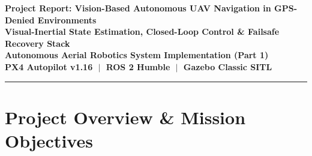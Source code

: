 \documentclass[11pt,a4paper]{article}
\begin{document}
\begin{center}
  {\huge\bfseries\color{primary} Project Report: Vision-Based Autonomous UAV Navigation in GPS-Denied Environments}\\[0.35cm]
  {\Large\bfseries\color{secondary} Visual-Inertial State Estimation, Closed-Loop Control \& Failsafe Recovery Stack}\\[0.4cm]
  {\normalsize\textbf{Autonomous Aerial Robotics System Implementation (Part 1)}}\\[0.15cm]
  {\small\color{subtletext}\textbf{PX4 Autopilot v1.16 $\;\vert\;$ ROS 2 Humble $\;\vert\;$ Gazebo Classic SITL}}\\[0.25cm]
  \rule{\textwidth}{0.8pt}
\end{center}

\vspace{0.2cm}

\begin{abstract}
\noindent
This report documents the implementation and flight validation of a fully autonomous navigation and control pipeline for multirotor UAVs operating in GPS-denied and magnetically unreferenced environments. By integrating an external visual odometry (EV) bridge with PX4's 24-state Extended Kalman Filter (EKF2) over ROS 2 Humble and Micro-XRCE-DDS middleware, the system completely removes all dependence on GNSS satellite signals and magnetic compass headings.

The pipeline achieves fully automated arming, ascent to $10.0\text{ m}$ altitude in Offboard mode, sub-centimeter hover stability ($\le 0.01\text{ m}$ lateral drift over $90\text{ s}$ against a $\le 1.50\text{ m}$ requirement), resilience across an $8.0\text{ s}$ simulated visual blackout via pure IMU dead-reckoning, rapid filter re-convergence, and precision autonomous landing.
\end{abstract}

\vspace{0.3cm}

\section{Project Overview \& Mission Objectives}
\end{document}
